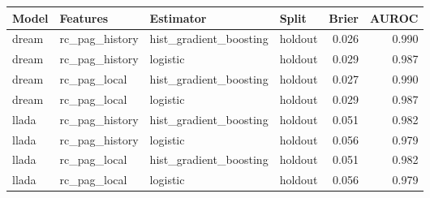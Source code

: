 \begin{tabular}{llllrr}
\toprule
Model & Features & Estimator & Split & Brier & AUROC \\
\midrule
dream & rc\_pag\_history & hist\_gradient\_boosting & holdout & 0.026 & 0.990 \\
dream & rc\_pag\_history & logistic & holdout & 0.029 & 0.987 \\
dream & rc\_pag\_local & hist\_gradient\_boosting & holdout & 0.027 & 0.990 \\
dream & rc\_pag\_local & logistic & holdout & 0.029 & 0.987 \\
llada & rc\_pag\_history & hist\_gradient\_boosting & holdout & 0.051 & 0.982 \\
llada & rc\_pag\_history & logistic & holdout & 0.056 & 0.979 \\
llada & rc\_pag\_local & hist\_gradient\_boosting & holdout & 0.051 & 0.982 \\
llada & rc\_pag\_local & logistic & holdout & 0.056 & 0.979 \\
\bottomrule
\end{tabular}
